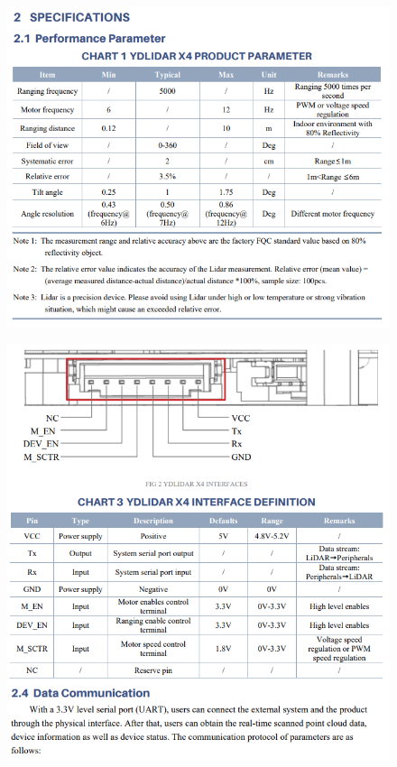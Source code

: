 \begin{figure}[H]
	\centering
	\includegraphics[width=1\textwidth]{Figures/Appendecis/x4-model-3}
\end{figure}

\begin{figure}[H]
	\centering
	\includegraphics[width=1\textwidth]{Figures/Appendecis/x4-model-4}
\end{figure}

